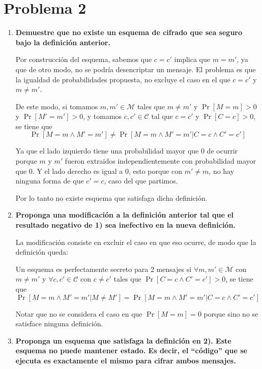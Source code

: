 \documentclass[twoside]{tareas}
\begin{document}
\section*{Problema 2}

\begin{enumerate}
    \item \textbf{Demuestre que no existe un esquema de cifrado que sea seguro bajo la definición anterior.}

    Por construcción del esquema, sabemos que $c=c'$ implica que $m=m'$, ya que de otro modo, no se podría desencriptar un mensaje. El problema es que la igualdad de probabilidades propuesta, no excluye el caso en el que $c=c'$ y $m \neq m'$.

    De este modo, si tomamos $m, m' \in \mathcal{M}$ tales que $m \neq m'$ y $\Pr[M=m] > 0$ y $\Pr[M'=m'] > 0$, y tomamos $c, c' \in \mathcal{C}$ tal que $c=c'$ y $\Pr[C=c] > 0$, se tiene que
    $$\Pr[M=m \wedge M'=m'] \neq \Pr[M=m \wedge M'=m' | C=c \wedge C'=c']$$

    Ya que el lado izquierdo tiene una probabilidad mayor que 0 de ocurrir porque $m$ y $m'$ fueron extraidos independientemente con probabilidad mayor que 0. Y el lado derecho es igual a 0, esto porque con $m' \neq m$, no hay ninguna forma de que $c' = c$, caso del que partimos.

    Por lo tanto no existe esquema que satisfaga dicha definición.

    \item \textbf{Proponga una modificación a la definición anterior tal que el resultado negativo de 1) sea inefectivo en la nueva definición.}

    La modificación consiste en excluir el caso en que eso ocurre, de modo que la definición queda:

    Un esquema es perfectamente secreto para 2 mensajes si $\forall m, m' \in \mathcal{M}$ con  $m \neq m'$  y $\forall c, c' \in \mathcal{C}$ con $c \neq c'$ tales que $\Pr[C=c \wedge C'=c'] > 0$, se tiene que
    $$\Pr[M=m \wedge M'=m' | M \neq M'] = \Pr[M=m \wedge M'=m' | C=c \wedge C'=c']$$

    Notar que no se considera el caso en que $\Pr[M=m] = 0$ porque sino no se satisface ninguna definición.

    \item \textbf{Proponga un esquema que satisfaga la definición en 2). Este esquema no puede mantener estado. Es decir, el “código” que se ejecuta es exactamente el mismo para cifrar ambos mensajes.}


\end{enumerate}
\end{document}
